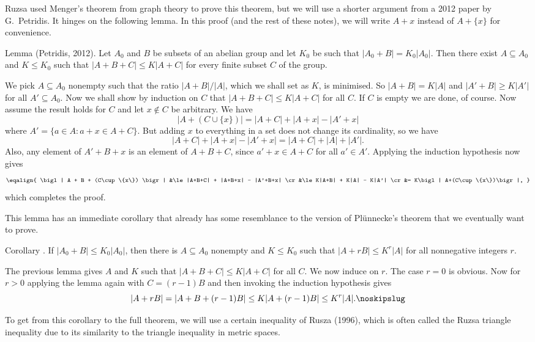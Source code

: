 Ruzsa used Menger's theorem from graph theory to prove this theorem, but we will use a shorter
argument from a 2012 paper by G.~Petridis. It hinges on the following lemma. In this proof (and the
rest of these notes), we will write $A+x$ instead of $A+\{x\}$ for convenience.

\edef\lempetridis{\the\thmcount}
\parenproclaim Lemma {\advthm} (Petridis, {\rm 2012}). Let $A_0$ and $B$ be subsets of an abelian
group and let $K_0$ be such that $|A_0+B| = K_0|A_0|$. Then there exist $A\subseteq A_0$ and
$K\le K_0$ such that $|A+B+C| \le K|A+C|$ for every finite subset $C$ of the group.

\proof We pick $A\subseteq A_0$ nonempty such that the ratio $|A+B|/|A|$, which we shall
set as $K$, is minimised. So $|A+B| = K|A|$ and $|A'+B|\ge K|A'|$ for all $A'\subseteq A_0$.
Now we shall show by induction on $C$ that $|A+B+C|\le K|A+C|$ for all $C$. If $C$ is empty we
are done, of course. Now assume the result holds for $C$ and let $x\notin C$ be arbitrary. We have
$$\bigl| A+(C\cup \{x\}) \bigr| = |A+C| + |A+x| - |A'+x|$$
where $A' = \{a\in A : a+x \in A+C\}$. But adding $x$ to everything in a set does not change its
cardinality, so we have
$$|A+C| + |A+x|-|A'+x| = |A+C| + |A| + |A'|.$$
Also, any element of $A'+B+x$ is an element of $A+B+C$, since $a'+x\in A+C$ for all $a'\in A'$.
Applying the induction hypothesis now gives
$$\eqalign{
\bigl| A + B + (C\cup \{x\}) \bigr| &\le |A+B+C| + |A+B+x| - |A'+B+x| \cr
&\le K|A+B| + K|A| - K|A'| \cr
&= K\bigl| A+(C\cup \{x\})\bigr|,
}$$
which completes the proof.\slug

This lemma has an immediate corollary that already has some resemblance to the version of Pl\"unnecke's
theorem that we eventually want to prove.

\edef\corpetridis{\the\thmcount}
\proclaim Corollary {\advthm}. If $|A_0 + B|\le K_0|A_0|$, then there is $A\subseteq A_0$ nonempty
and $K\le K_0$ such that $|A+rB| \le K^r |A|$ for all nonnegative integers $r$.

\proof The previous lemma gives $A$ and $K$ such that $|A+B+C|\le K|A+C|$ for all $C$. We now induce
on $r$. The case $r=0$ is obvious. Now for $r>0$ applying the lemma again with $C = (r-1)B$ and
then invoking the induction hypothesis gives
$$|A+rB| = |A+B+(r-1)B| \le K|A+(r-1)B| \le K^r|A|.\noskipslug$$

To get from this corollary to the full theorem, we will use a certain inequality of Rusza (1996), which
is often called the Ruzsa triangle inequality due to its similarity to the triangle inequality in
metric spaces.

